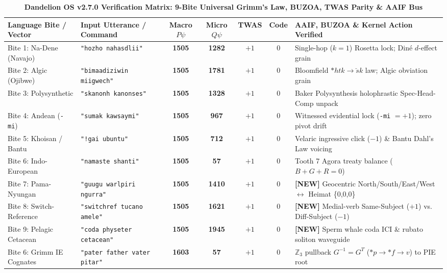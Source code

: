 \documentclass[10pt,twocolumn,letterpaper]{article}
\begin{document}
\begin{table}[t]
\centering
\caption{\textbf{Dandelion OS v2.7.0 Verification Matrix: 9-Bite Universal Grimm's Law, BUZOA, TWAS Parity \& AAIF Bus}}
\vspace{2pt}
\scriptsize
\begin{tabularx}{\textwidth}{>{\raggedright\arraybackslash}p{31mm} >{\raggedright\arraybackslash}p{39mm} c c c c >{\raggedright\arraybackslash}X}
\toprule
\textbf{Language Bite / Vector} & \textbf{Input Utterance / Command} & \textbf{Macro $P\psi$} & \textbf{Micro $Q\psi$} & \textbf{TWAS} & \textbf{Code} & \textbf{AAIF, BUZOA \& Kernel Action Verified} \\
\midrule
Bite 1: Na-Dene (Navajo) & \texttt{"hozho nahasdlii"} & \textbf{1505} & \textbf{1282} & $+1$ & 0 & Single-hop ($k=1$) Rosetta lock; Din\'e $d$-effect grain \\
Bite 2: Algic (Ojibwe) & \texttt{"bimaadiziwin miigwech"} & \textbf{1505} & \textbf{1781} & $+1$ & 0 & Bloomfield $*htk \to \check{s}k$ law; Algic obviation grain \\
Bite 3: Polysynthetic & \texttt{"skanonh kanonses"} & \textbf{1505} & \textbf{1328} & $+1$ & 0 & Baker Polysynthesis holophrastic Spec-Head-Comp unpack \\
Bite 4: Andean (\texttt{-mi}) & \texttt{"sumak kawsaymi"} & \textbf{1505} & \textbf{967} & $+1$ & 0 & Witnessed evidential lock (\texttt{-mi} $= +1$); zero pivot drift \\
Bite 5: Khoisan / Bantu & \texttt{"!gai ubuntu"} & \textbf{1505} & \textbf{712} & $+1$ & 0 & Velaric ingressive click ($-1$) \& Bantu Dahl's Law voicing \\
Bite 6: Indo-European & \texttt{"namaste shanti"} & \textbf{1505} & \textbf{57} & $+1$ & 0 & Tooth 7 Agora treaty balance ($B+G+R=0$) \\
Bite 7: Pama-Nyungan & \texttt{"guugu warlpiri ngurra"} & \textbf{1505} & \textbf{1410} & $+1$ & 0 & \textbf{[NEW]} Geocentric North/South/East/West $\leftrightarrow$ Heimat \{0,0,0\} \\
Bite 8: Switch-Reference & \texttt{"switchref tucano amele"} & \textbf{1505} & \textbf{1621} & $+1$ & 0 & \textbf{[NEW]} Medial-verb Same-Subject ($+1$) vs. Diff-Subject ($-1$) \\
Bite 9: Pelagic Cetacean & \texttt{"coda physeter cetacean"} & \textbf{1505} & \textbf{1945} & $+1$ & 0 & \textbf{[NEW]} Sperm whale coda ICI \& rubato soliton waveguide \\
Bite 6: Grimm IE Cognates & \texttt{"pater father vater pitar"} & \textbf{1603} & \textbf{57} & $+1$ & 0 & $\mathbb{Z}_3$ pullback $G^{-1}=G^T$ ($*p \to *f \to v$) to PIE root \\

\end{tabularx}
\end{table}
\end{document}
